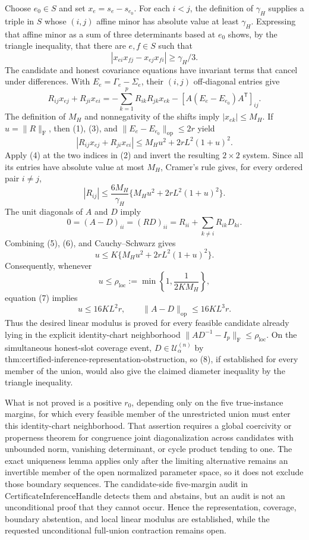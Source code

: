Choose \(e_0\in S\) and set \(x_e=s_e-s_{e_0}\).  For each \(i<j\), the definition of \(\gamma_H\) supplies a triple in \(S\) whose \((i,j)\) affine minor has absolute value at least \(\gamma_H\).  Expressing that affine minor as a sum of three determinants based at \(e_0\) shows, by the triangle inequality, that there are \(e,f\in S\) such that
\[
 |x_{ei}x_{fj}-x_{ej}x_{fi}|\ge \gamma_H/3.
 \tag{2}
\]
The candidate and honest covariance equations have invariant terms that cancel under differences.  With \(E_e=\Gamma_e-\Sigma_e\), their \((i,j)\) off-diagonal entries give
\[
 R_{ij}x_{ej}+R_{ji}x_{ei}
 =-\sum_{k=1}^p R_{ik}R_{jk}x_{ek}
   -[A(E_e-E_{e_0})A^{\mathsf T}]_{ij}.
 \tag{3}
\]
The definition of \(M_H\) and nonnegativity of the shifts imply \(|x_{ek}|\le M_H\).  If \(u=\|R\|_{\mathrm F}\), then (1), (3), and \(\|E_e-E_{e_0}\|_{\mathrm{op}}\le2r\) yield
\[
 |R_{ij}x_{ej}+R_{ji}x_{ei}|
 \le M_Hu^2+2rL^2(1+u)^2.
 \tag{4}
\]
Apply (4) at the two indices in (2) and invert the resulting \(2\times2\) system.  Since all its entries have absolute value at most \(M_H\), Cramer's rule gives, for every ordered pair \(i\ne j\),
\[
 |R_{ij}|
 \le \frac{6M_H}{\gamma_H}
 \{M_Hu^2+2rL^2(1+u)^2\}.
 \tag{5}
\]
The unit diagonals of \(A\) and \(D\) imply
\[
 0=(A-D)_{ii}=(RD)_{ii}
 =R_{ii}+\sum_{k\ne i}R_{ik}D_{ki}.
 \tag{6}
\]
Combining (5), (6), and Cauchy--Schwarz gives
\[
 u\le K\{M_Hu^2+2rL^2(1+u)^2\}.
 \tag{7}
\]
Consequently, whenever
\[
 u\le \rho_{\mathrm{loc}}
 :=\min\left\{1,\frac{1}{2KM_H}\right\},
\]
equation (7) implies
\[
 u\le16KL^2r,
 \qquad
 \|A-D\|_{\mathrm{op}}
 \le16KL^3r.
 \tag{8}
\]
Thus the desired linear modulus is proved for every feasible candidate already lying in the explicit identity-chart neighborhood \(\|AD^{-1}-I_p\|_{\mathrm F}\le\rho_{\mathrm{loc}}\).  On the simultaneous honest-slot coverage event, \(D\in\mathcal U^{(n)}_\alpha\) by \(\text{thm:certified-inference-representation-obstruction}\), so (8), if established for every member of the union, would also give the claimed diameter inequality by the triangle inequality.

What is not proved is a positive \(r_0\), depending only on the five true-instance margins, for which every feasible member of the unrestricted union must enter this identity-chart neighborhood.  That assertion requires a global coercivity or properness theorem for congruence joint diagonalization across candidates with unbounded norm, vanishing determinant, or cycle product tending to one.  The exact uniqueness lemma applies only after the limiting alternative remains an invertible member of the open normalized parameter space, so it does not exclude those boundary sequences.  The candidate-side five-margin audit in \(\text{CertificateInferenceHandle}\) detects them and abstains, but an audit is not an unconditional proof that they cannot occur.  Hence the representation, coverage, boundary abstention, and local linear modulus are established, while the requested unconditional full-union contraction remains open.